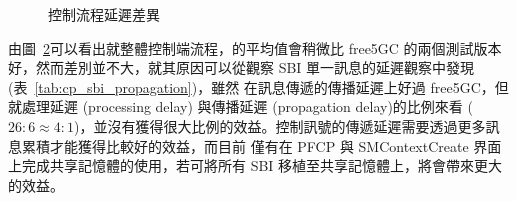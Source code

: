 \begin{figure}[htb]
\begin{subfigure}[b]{.5\linewidth}
        \caption[]{{\footnotesize}}
        \label{fig:cp_proc_ho}
    \end{subfigure}%
    \caption[控制流程延遲差異]{{\footnotesize 控制流程延遲差異}}
    \label{fig:cp_proc_comp}
\end{figure}

由圖~\ref{fig:cp_proc_comp}可以看出就整體控制端流程，\LHCN 的平均值會稍微比 free5GC 的兩個測試版本好，然而差別並不大，就其原因可以從觀察 SBI 單一訊息的延遲觀察中發現 (表~\ref{tab:cp_sbi_propagation})，雖然 \LHCN 在訊息傳遞的傳播延遲上好過 free5GC，但就處理延遲 (processing delay) 與傳播延遲 (propagation delay)的比例來看 ($26:6 \approx 4:1$)，並沒有獲得很大比例的效益。控制訊號的傳遞延遲需要透過更多訊息累積才能獲得比較好的效益，而目前 \LHCN 僅有在 PFCP 與 SMContextCreate 界面上完成共享記憶體的使用，若可將所有 SBI 移植至共享記憶體上，將會帶來更大的效益。
